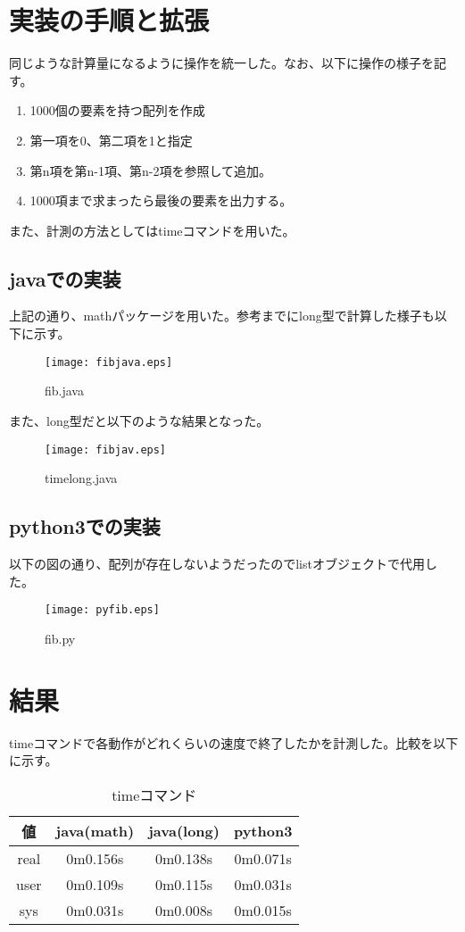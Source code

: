 \documentclass[a4j]{jreport}
\begin{document}
\section{実装の手順と拡張}
同じような計算量になるように操作を統一した。なお、以下に操作の様子を記す。
\begin{enumerate}
\item 1000個の要素を持つ配列を作成
\item 第一項を0、第二項を1と指定
\item 第n項を第n-1項、第n-2項を参照して追加。
\item 1000項まで求まったら最後の要素を出力する。
\end{enumerate}
また、計測の方法としてはtimeコマンドを用いた。
\subsection{javaでの実装}
上記の通り、mathパッケージを用いた。参考までにlong型で計算した様子も以下に示す。
\begin{figure}[H]
  \centering
  \texttt{[image: fibjava.eps]}
  \caption{fib.java}
  \label{figure:java}
\end{figure}

また、long型だと以下のような結果となった。
\begin{figure}[H]
  \centering
  \texttt{[image: fibjav.eps]}
  \caption{timelong.java}
  \label{timelong:java}
\end{figure}
\subsection{python3での実装}
以下の図の通り、配列が存在しない\cite{py}ようだったのでlistオブジェクトで代用した。
\begin{figure}[H]
  \centering
  \texttt{[image: pyfib.eps]}
  \caption{fib.py}
  \label{figure:python}
\end{figure}
\section{結果}
timeコマンド\cite{time}で各動作がどれくらいの速度で終了したかを計測した。比較を以下に示す。
\begin{table}[H]
  \centering
  \caption{timeコマンド}

  \begin{tabular}{|c|c|c|c|}
    \hline
    値 & java(math) & java(long) & python3 \\
    \hline
    real & 0m0.156s & 0m0.138s & 0m0.071s \\
    user & 0m0.109s & 0m0.115s & 0m0.031s \\
    sys & 0m0.031s & 0m0.008s & 0m0.015s \\
    \hline
  \end{tabular}
\end{table}
\end{document}
